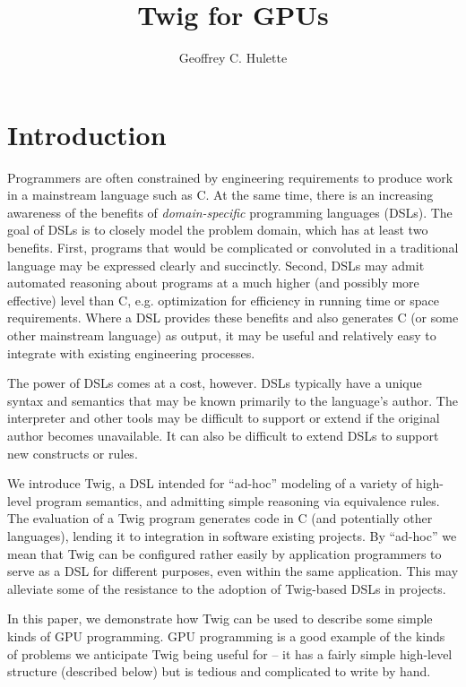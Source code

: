 \documentclass[11pt]{article}
\title{Twig for GPUs}
\author{Geoffrey C. Hulette}
\begin{document}
\maketitle
\thispagestyle{empty}

\section{Introduction}

Programmers are often constrained by engineering requirements to produce work
in a mainstream language such as C. At the same time, there is an increasing
awareness of the benefits of \emph{domain-specific} programming languages
(DSLs). The goal of DSLs is to closely model the problem domain, which has at
least two benefits. First, programs that would be complicated or convoluted in
a traditional language may be expressed clearly and succinctly. Second, DSLs
may admit automated reasoning about programs at a much higher (and possibly
more effective) level than C, e.g. optimization for efficiency in running time
or space requirements. Where a DSL provides these benefits and also generates
C (or some other mainstream language) as output, it may be useful and
relatively easy to integrate with existing engineering processes.

The power of DSLs comes at a cost, however. DSLs typically have a unique
syntax and semantics that may be known primarily to the language's author. The
interpreter and other tools may be difficult to support or extend if the
original author becomes unavailable. It can also be difficult to extend DSLs
to support new constructs or rules. 

We introduce Twig, a DSL intended for ``ad-hoc'' modeling of a variety of
high-level program semantics, and admitting simple reasoning via equivalence
rules. The evaluation of a Twig program generates code in C (and potentially
other languages), lending it to integration in software existing projects. By
``ad-hoc'' we mean that Twig can be configured rather easily by application
programmers to serve as a DSL for different purposes, even within the same
application. This may alleviate some of the resistance to the adoption of
Twig-based DSLs in projects.

In this paper, we demonstrate how Twig can be used to describe some simple
kinds of GPU programming. GPU programming is a good example of the kinds of
problems we anticipate Twig being useful for -- it has a fairly simple
high-level structure (described below) but is tedious and complicated to write
by hand.
\end{document}
